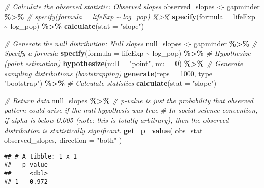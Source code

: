 \documentclass[
]{book}
\newenvironment{Shaded}{\begin{snugshade}}{\end{snugshade}}
\newcommand{\CommentTok}[1]{\textcolor[rgb]{0.56,0.35,0.01}{\textit{#1}}}
\newcommand{\DataTypeTok}[1]{\textcolor[rgb]{0.13,0.29,0.53}{#1}}
\newcommand{\DecValTok}[1]{\textcolor[rgb]{0.00,0.00,0.81}{#1}}
\newcommand{\KeywordTok}[1]{\textcolor[rgb]{0.13,0.29,0.53}{\textbf{#1}}}
\newcommand{\NormalTok}[1]{#1}
\newcommand{\OperatorTok}[1]{\textcolor[rgb]{0.81,0.36,0.00}{\textbf{#1}}}
\newcommand{\StringTok}[1]{\textcolor[rgb]{0.31,0.60,0.02}{#1}}
\begin{document}
\begin{Shaded}
\begin{Highlighting}[]
\CommentTok{\# Calculate the observed statistic: Observed slopes}
\NormalTok{observed\_slopes \textless{}{-}}\StringTok{ }\NormalTok{gapminder }\OperatorTok{\%\textgreater{}\%}
\StringTok{  }\CommentTok{\# specify(formula = lifeExp \textasciitilde{} log\_pop) \%\textgreater{}\%}
\StringTok{  }\KeywordTok{specify}\NormalTok{(}\DataTypeTok{formula =}\NormalTok{ lifeExp }\OperatorTok{\textasciitilde{}}\StringTok{ }\NormalTok{log\_pop) }\OperatorTok{\%\textgreater{}\%}
\StringTok{  }\KeywordTok{calculate}\NormalTok{(}\DataTypeTok{stat =} \StringTok{"slope"}\NormalTok{)}

\CommentTok{\# Generate the null distribution: Null slopes}
\NormalTok{null\_slopes \textless{}{-}}\StringTok{ }\NormalTok{gapminder }\OperatorTok{\%\textgreater{}\%}
\StringTok{  }\CommentTok{\# Specify a formula}
\StringTok{  }\KeywordTok{specify}\NormalTok{(}\DataTypeTok{formula =}\NormalTok{ lifeExp }\OperatorTok{\textasciitilde{}}\StringTok{ }\NormalTok{log\_pop) }\OperatorTok{\%\textgreater{}\%}
\StringTok{  }\CommentTok{\# Hypothesize (point estimation)}
\StringTok{  }\KeywordTok{hypothesize}\NormalTok{(}\DataTypeTok{null =} \StringTok{"point"}\NormalTok{, }\DataTypeTok{mu =} \DecValTok{0}\NormalTok{) }\OperatorTok{\%\textgreater{}\%}
\StringTok{  }\CommentTok{\# Generate sampling distributions (bootstrapping)}
\StringTok{  }\KeywordTok{generate}\NormalTok{(}\DataTypeTok{reps =} \DecValTok{1000}\NormalTok{, }\DataTypeTok{type =} \StringTok{"bootstrap"}\NormalTok{) }\OperatorTok{\%\textgreater{}\%}
\StringTok{  }\CommentTok{\# Calculate statistics}
\StringTok{  }\KeywordTok{calculate}\NormalTok{(}\DataTypeTok{stat =} \StringTok{"slope"}\NormalTok{)}

\CommentTok{\# Return data}
\NormalTok{null\_slopes }\OperatorTok{\%\textgreater{}\%}
\StringTok{  }\CommentTok{\# p{-}value is just the probability that observed pattern could arise if the null hypothesis was true}
\StringTok{  }\CommentTok{\# In social science convention, if alpha is below 0.005 (note: this is totally arbitrary), then the observed distribution is statistically significant.}
\StringTok{  }\KeywordTok{get\_p\_value}\NormalTok{(}
    \DataTypeTok{obs\_stat =}\NormalTok{ observed\_slopes,}
    \DataTypeTok{direction =} \StringTok{"both"}
\NormalTok{  )}
\end{Highlighting}
\end{Shaded}

\begin{verbatim}
## # A tibble: 1 x 1
##   p_value
##     <dbl>
## 1   0.972
\end{verbatim}
\end{document}
